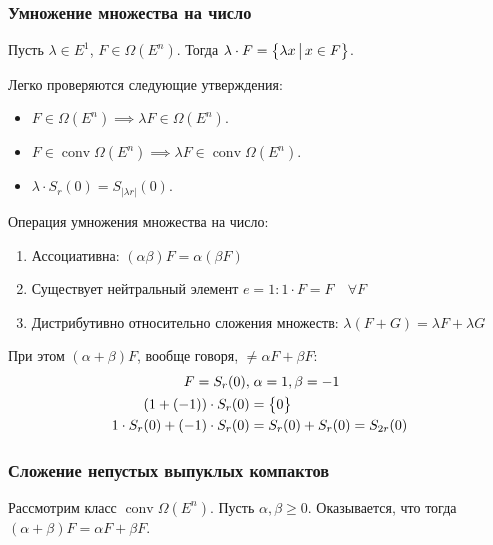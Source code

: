 \subsubsection{Умножение множества на число}
\begin{defn}
    Пусть $\lambda \in E^1$, $F \in \Omega(E^n)$.
    Тогда $\lambda \cdot F = \bigl\{ \lambda x\, \bigl| \, x \in F \bigr\}$.
\end{defn}

Легко проверяются следующие утверждения:
\begin{itemize}
    \item $F \in \Omega(E^n) \implies \lambda F \in \Omega(E^n)$.
    \item $F \in \operatorname{conv} \Omega(E^n) \implies \lambda F \in \operatorname{conv} \Omega(E^n)$.
    \item $\lambda \cdot S_r(0) = S_{|\lambda r|}(0)$.
\end{itemize}

Операция умножения множества на число:
\begin{enumerate}
    \item Ассоциативна: $(\alpha \beta) F = \alpha (\beta F)$
    \item Существует нейтральный элемент $e = 1\colon 1 \cdot F = F \quad \forall F$
    \item Дистрибутивно относительно сложения множеств: $\lambda (F + G) = \lambda F + \lambda G$
\end{enumerate}

При этом $(\alpha + \beta)F$, вообще говоря, $ \neq \alpha F + \beta F$:
\begin{align*}
    F = S_r(0), & \; \alpha = 1, \beta = -1 \\
    (1 + (-1)) \cdot S_r(0) & = \bigl\{ 0 \bigr\} \\
    1 \cdot S_r(0) + (-1) \cdot S_r(0) & = 
    S_r(0) + S_r(0) = S_{2 r}(0)
\end{align*}

\subsubsection{Сложение непустых выпуклых компактов}
Рассмотрим класс $\operatorname{conv} \Omega(E^n)$.
Пусть $\alpha, \beta \geqslant 0$.
Оказывается, что тогда $(\alpha + \beta) F = \alpha F + \beta F $.


